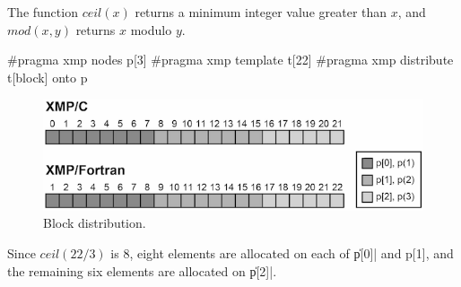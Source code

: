 \begin{mynote}
  The function $ceil(x)$ returns a minimum integer value greater than
  $x$, and $mod(x,y)$ returns $x$ modulo $y$.
\end{mynote}

\begin{XCexample}
#pragma xmp nodes p[3]
#pragma xmp template t[22]
#pragma xmp distribute t[block] onto p
\end{XCexample}


\begin{figure}
  \centering
  \includegraphics[width=0.9\columnwidth]{figs/block.png}
  \caption{Block distribution.}
\end{figure}

Since $ceil(22/3)$ is 8, eight elements are allocated on each of \|p[0]|
and p[1], and the remaining six elements are allocated on \|p[2]|.








